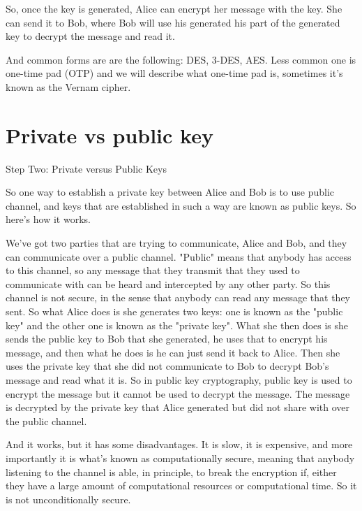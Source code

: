 So, once the key is generated, Alice can encrypt her message with the key. She can send it to Bob, where Bob will use his generated his part of the generated key to decrypt the message and read it.

And common forms are are the following: DES, 3-DES, AES. Less common one is one-time pad (OTP) and we will describe what one-time pad is, sometimes it's known as the Vernam cipher.


\section{Private vs public key}

Step Two: Private versus Public Keys

So one way to establish a private key between Alice and Bob is to use public channel, and keys that are established in such a way are known as public keys. So here's how it works.

We've got two parties that are trying to communicate, Alice and Bob, and they can communicate over a public channel. "Public" means that anybody has access to this channel, so any message that they transmit that they used to communicate with can be heard and intercepted by any other party. So this channel is not secure, in the sense that anybody can read any message that they sent. So what Alice does is she generates two keys: one is known as the "public key" and the other one is known as the "private key". What she then does is she sends the public key to Bob that she generated, he uses that to encrypt his message, and then what he does is he can just send it back to Alice. Then she uses the private key that she did not communicate to Bob to decrypt Bob's message and read what it is. So in public key cryptography, public key is used to encrypt the message but it cannot be used to decrypt the message. The message is decrypted by the private key that Alice generated but did not share with over the public channel.

And it works, but it has some disadvantages. It is slow, it is expensive, and more importantly it is what's known as computationally secure, meaning that anybody listening to the channel is able, in principle, to break the encryption if, either they have a large amount of computational resources or computational time. So it is not unconditionally secure.

